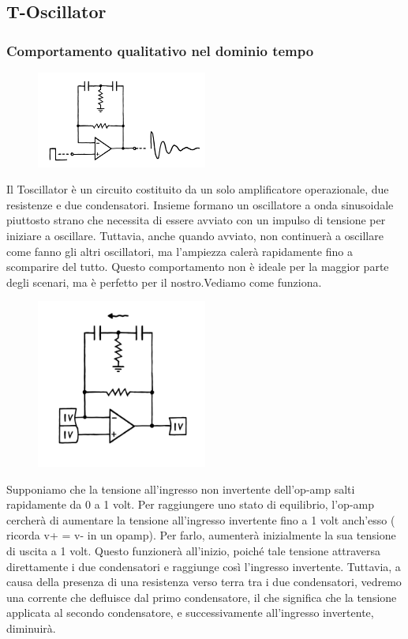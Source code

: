 \documentclass{article}
\theoremstyle{definition}
\begin{document}
\subsection{T-Oscillator}
\subsubsection{Comportamento qualitativo nel dominio tempo}
\begin{figure}[ht]
    \centering
    \includegraphics[width=0.5\textwidth]{Toscillator.png} 
    \label{fig:Toscillator}
\end{figure}

Il Toscillator è un circuito costituito da un solo amplificatore operazionale, due resistenze e due condensatori. Insieme formano un oscillatore a onda sinusoidale piuttosto strano che necessita di essere avviato con un impulso di tensione per iniziare a oscillare.
Tuttavia, anche quando avviato, non continuerà a oscillare come fanno gli altri oscillatori, ma l'ampiezza calerà rapidamente fino a scomparire del tutto. Questo comportamento non è ideale per la maggior parte degli scenari, ma è perfetto per il nostro.Vediamo come funziona.

\begin{figure}[ht]
    \centering
    \includegraphics[width=0.5\textwidth]{Toscillator1.png} 
    \label{fig:Toscillator1}
\end{figure}

 Supponiamo che la tensione all'ingresso non invertente dell'op-amp salti rapidamente da 0 a 1 volt. Per raggiungere uno stato di equilibrio, l'op-amp cercherà di aumentare la tensione all'ingresso invertente fino a 1 volt anch'esso ( ricorda v+ = v- in un opamp).
 Per farlo, aumenterà inizialmente la sua tensione di uscita a 1 volt. Questo funzionerà all'inizio, poiché tale tensione attraversa direttamente i due condensatori e raggiunge così l'ingresso invertente.
 Tuttavia, a causa della presenza di una resistenza verso terra tra i due condensatori, vedremo una corrente che defluisce dal primo condensatore, il che significa che la tensione applicata al secondo condensatore, e successivamente all'ingresso invertente, diminuirà.
\end{document}
